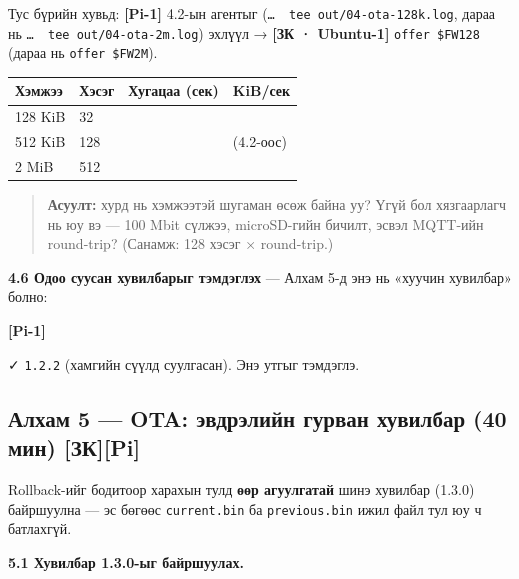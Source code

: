 Тус бүрийн хувьд: \textbf{{[}Pi-1{]}} 4.2-ын агентыг (\texttt{\ldots{}\ \textbar{}\ tee\ out/04-ota-128k.log}, дараа нь \texttt{\ldots{}\ \textbar{}\ tee\ out/04-ota-2m.log}) эхлүүл → \textbf{{[}ЗК · Ubuntu-1{]}} \texttt{offer\ \$FW128} (дараа нь \texttt{offer\ \$FW2M}).

\begingroup\scriptsize\begin{longtable}[]{@{}llll@{}}
\toprule
Хэмжээ & Хэсэг & Хугацаа (сек) & KiB/сек\tabularnewline
\midrule
\endhead
128 KiB & 32 & &\tabularnewline
512 KiB & 128 & & (4.2-оос)\tabularnewline
2 MiB & 512 & &\tabularnewline
\bottomrule
\end{longtable}\endgroup

\begin{quote}
\textbf{Асуулт:} хурд нь хэмжээтэй шугаман өсөж байна уу? Үгүй бол хязгаарлагч нь юу вэ --- 100 Mbit сүлжээ, microSD-гийн бичилт, эсвэл MQTT-ийн round-trip? (Санамж: 128 хэсэг × round-trip.)
\end{quote}

\textbf{4.6 Одоо суусан хувилбарыг тэмдэглэх} --- Алхам 5-д энэ нь «хуучин хувилбар» болно:

\textbf{{[}Pi-1{]}}

\begin{Shaded}
\begin{Highlighting}[]
\end{Highlighting}
\end{Shaded}

✓ \texttt{1.2.2} (хамгийн сүүлд суулгасан). Энэ утгыг тэмдэглэ.

\hypertarget{ux430ux43bux445ux430ux43c-5-ota-ux44dux432ux434ux440ux44dux43bux438ux439ux43d-ux433ux443ux440ux432ux430ux43d-ux445ux443ux432ux438ux43bux431ux430ux440-40-ux43cux438ux43d-ux437ux43api}{%
\subsection{Алхам 5 --- OTA: эвдрэлийн гурван хувилбар (40 мин) {[}ЗК{]}{[}Pi{]}}\label{ux430ux43bux445ux430ux43c-5-ota-ux44dux432ux434ux440ux44dux43bux438ux439ux43d-ux433ux443ux440ux432ux430ux43d-ux445ux443ux432ux438ux43bux431ux430ux440-40-ux43cux438ux43d-ux437ux43api}}

Rollback-ийг бодитоор харахын тулд \textbf{өөр агуулгатай} шинэ хувилбар (1.3.0) байршуулна --- эс бөгөөс \texttt{current.bin} ба \texttt{previous.bin} ижил файл тул юу ч батлахгүй.

\textbf{5.1 Хувилбар 1.3.0-ыг байршуулах.}

